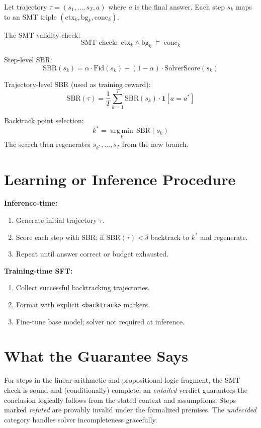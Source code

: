 \documentclass[10pt,twocolumn]{article}
\begin{document}
Let trajectory $\tau = (s_1,\ldots,s_T, a)$ where $a$ is the final
answer. Each step $s_k$ maps to an SMT triple
$(\mathrm{ctx}_k, \mathrm{bg}_k, \mathrm{conc}_k)$.

The SMT validity check:
\[
\mathrm{SMT\text{-}check}: \;\mathrm{ctx}_k \wedge \mathrm{bg}_k
  \;\models\; \mathrm{conc}_k
\]

Step-level SBR:
\[
\mathrm{SBR}(s_k)
= \alpha\cdot\mathrm{Fid}(s_k)
+ (1-\alpha)\cdot\mathrm{SolverScore}(s_k)
\]

Trajectory-level SBR (used as training reward):
\[
\mathrm{SBR}(\tau)
= \frac{1}{T}\sum_{k=1}^{T}\mathrm{SBR}(s_k)
  \cdot \mathbf{1}[a = a^*]
\]

Backtrack point selection:
\[
k^* = \operatorname*{arg\,min}_{k}\,\mathrm{SBR}(s_k)
\]
The search then regenerates $s_{k^*},\ldots,s_T$ from the new branch.

\section{Learning or Inference Procedure}

\textbf{Inference-time:}
\begin{enumerate}[itemsep=2pt,parsep=0pt]
  \item Generate initial trajectory $\tau$.
  \item Score each step with SBR; if $\mathrm{SBR}(\tau)<\delta$
    backtrack to $k^*$ and regenerate.
  \item Repeat until answer correct or budget exhausted.
\end{enumerate}

\textbf{Training-time SFT:}
\begin{enumerate}[itemsep=2pt,parsep=0pt]
  \item Collect successful backtracking trajectories.
  \item Format with explicit \texttt{<backtrack>} markers.
  \item Fine-tune base model; solver not required at inference.
\end{enumerate}

\section{What the Guarantee Says}

For steps in the linear-arithmetic and propositional-logic fragment,
the SMT check is sound and (conditionally) complete: an \emph{entailed}
verdict guarantees the conclusion logically follows from the stated
context and assumptions. Steps marked \emph{refuted} are provably
invalid under the formalized premises. The \emph{undecided} category
handles solver incompleteness gracefully.
\end{document}
